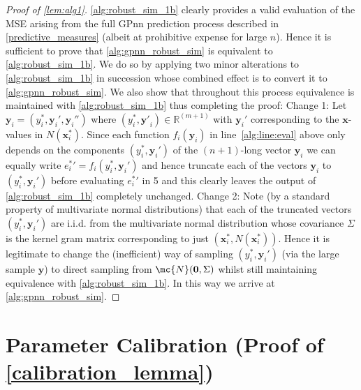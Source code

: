 \begin{proof}[Proof of \autoref{lem:alg1}]
\autoref{alg:robust_sim_1b} clearly provides a valid evaluation of the MSE arising from the full GPnn prediction process described in \autoref{predictive_measures} (albeit at prohibitive expense for large $n$). Hence it is sufficient to prove that \autoref{alg:gpnn_robust_sim} is equivalent to \autoref{alg:robust_sim_1b}. We do so by applying two minor alterations to \autoref{alg:robust_sim_1b} in succession whose combined effect is to convert it to \autoref{alg:gpnn_robust_sim}. We also show that throughout this process equivalence is maintained with \autoref{alg:robust_sim_1b} thus completing the proof:
\newline\newline
Change 1: Let $\bm{y}_i = (y_i^*,\bm{y}_i',\bm{y}_i'')$ where $(y^*_i,\bm{y'}_i) \in \mathbb{R}^{(m+1)}$ with $\bm{y}_i'$ corresponding to the $\bm{x}$-values in $N(\bm{x}_i^*)$. Since each function $f_i(\bm{y}_i)$ in line~\ref{alg:line:eval} above only depends on the components $(y_i^*,\bm{y}_i')$ of the $(n+1)$-long vector $\bm{y}_i$ we can equally write ${e_i^*}' = f_i(y_i^*,\bm{y}_i')$ and hence truncate each of the vectors $\bm{y}_i$ to $(y_i^*,\bm{y}_i')$ before evaluating ${e_i^*}'$ in 5 and this clearly leaves the output of \autoref{alg:robust_sim_1b} completely unchanged.
\newline\newline
Change 2: Note (by a standard property of multivariate normal distributions) that each of the truncated vectors $(y_i^*,\bm{y}_i')$ are i.i.d. from the multivariate normal distribution whose covariance $\Sigma$ is the kernel gram matrix corresponding to just $(\bm{x}_i^*, N(\bm{x}_i^*))$. Hence it is legitimate to change the (inefficient) way of sampling $(y_i^*,\bm{y}_i')$ (via the large sample $\bm{y}$) to direct sampling from $\mc{N}(\bm{0},\Sigma)$ whilst still maintaining equivalence with \autoref{alg:robust_sim_1b}. 
\newline\newline 
In this way we arrive at \autoref{alg:gpnn_robust_sim}.
\end{proof}

\section{Parameter Calibration (Proof of \autoref{calibration_lemma})}
\label{calibration_phase_proof}


